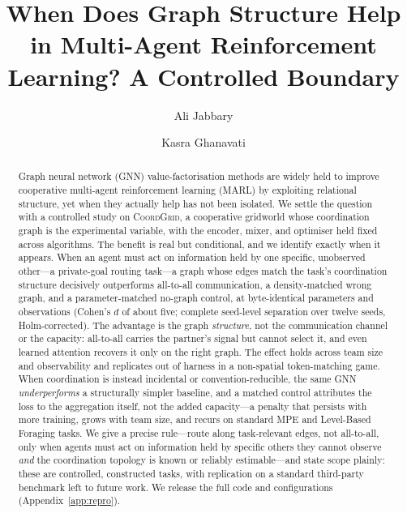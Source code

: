\documentclass[manuscript, screen, review]{jair}
\title[Graph Structure in Multi-Agent RL]{When Does Graph Structure Help in Multi-Agent Reinforcement Learning? A Controlled Boundary}
\newcommand{\coordgrid}{\textsc{CoordGrid}}
\begin{document}
\author{Ali Jabbary}

\author{Kasra Ghanavati}

\renewcommand{\shortauthors}{Jabbary \& Ghanavati}

\begin{abstract}
Graph neural network (GNN) value-factorisation methods are widely held to
improve cooperative multi-agent reinforcement learning (MARL) by exploiting
relational structure, yet when they actually help has not been isolated. We
settle the question with a controlled study on \coordgrid, a cooperative
gridworld whose coordination graph is the experimental variable, with the
encoder, mixer, and optimiser held fixed across algorithms. The benefit is real
but conditional, and we identify exactly when it appears. When an agent must act
on information held by one specific, unobserved other---a private-goal routing
task---a graph whose edges match the task's coordination structure decisively
outperforms all-to-all communication, a density-matched wrong graph, and a
parameter-matched no-graph control, at byte-identical parameters and observations
(Cohen's $d$ of about five; complete seed-level separation over twelve seeds,
Holm-corrected). The advantage is the graph \emph{structure}, not the
communication channel or the capacity: all-to-all carries the partner's signal
but cannot select it, and even learned attention recovers it only on the right
graph. The effect holds across team size and observability and replicates out of
harness in a non-spatial token-matching game. When coordination is instead
incidental or convention-reducible, the same GNN \emph{underperforms} a
structurally simpler baseline, and a matched control attributes the loss to the
aggregation itself, not the added capacity---a penalty that persists with more
training, grows with team size, and recurs on standard MPE and Level-Based
Foraging tasks. We give a precise rule---route along task-relevant edges, not
all-to-all, only when agents must act on information held by specific others they
cannot observe \emph{and} the coordination topology is known or reliably
estimable---and state scope plainly: these are controlled, constructed tasks,
with replication on a standard third-party benchmark left to future work. We
release the full code and configurations (Appendix~\ref{app:repro}).
\end{abstract}
\end{document}
